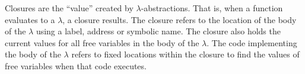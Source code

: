 \documentclass[12pt]{report}
\begin{document}
Closures are the ``value'' created by $\lambda$-abstractions. That is,
when a function evaluates to a $\lambda$, a closure results. The
closure refers to the location of the body of the $\lambda$ using a
label, address or symbolic name. The closure also holds the current
values for all free variables in the body of the $\lambda$. The code
implementing the body of the $\lambda$ refers to fixed locations
within the closure to find the values of free variables when that
code executes.




\end{document}
